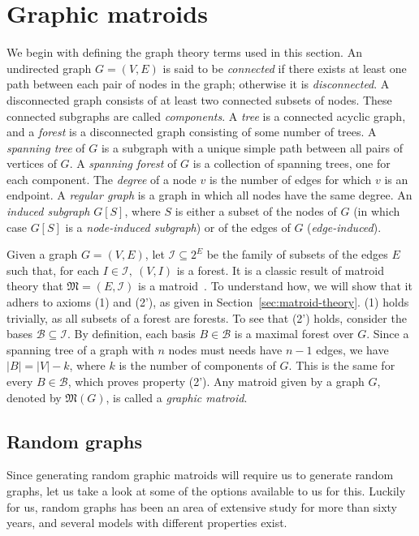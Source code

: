 \section{Graphic matroids}
We begin with defining the graph theory terms used in this section. An undirected graph $G=(V,E)$ is said to be \textit{connected} if there exists at least one path between each pair of nodes in the graph; otherwise it is \textit{disconnected}. A disconnected graph consists of at least two connected subsets of nodes. These connected subgraphs are called \textit{components}. A \textit{tree} is a connected acyclic graph, and a \textit{forest} is a disconnected graph consisting of some number of trees. A \textit{spanning tree} of $G$ is a subgraph with a unique simple path between all pairs of vertices of $G$. A \textit{spanning forest} of $G$ is a collection of spanning trees, one for each component. The \textit{degree} of a node $v$ is the number of edges for which $v$ is an endpoint. A \textit{regular graph} is a graph in which all nodes have the same degree. An \textit{induced subgraph} $G[S]$, where $S$ is either a subset of the nodes of $G$ (in which case $G[S]$ is a \textit{node-induced subgraph}) or of the edges of $G$ (\textit{edge-induced}).

Given a graph $G=(V,E)$, let $\mathcal{I} \subseteq 2^E$ be the family of subsets of the edges $E$ such that, for each $I \in \mathcal{I},\ (V, I)$ is a forest. It is a classic result of matroid theory that $\mathfrak{M} = (E, \mathcal{I})$ is a matroid~\cite[p.~657]{schrijver-2003}. To understand how, we will show that it adhers to axioms (1) and (2'), as given in Section~\ref{sec:matroid-theory}. (1) holds trivially, as all subsets of a forest are forests. To see that (2') holds, consider the bases $\mathcal{B} \subseteq \mathcal{I}$. By definition, each basis $B \in \mathcal{B}$ is a maximal forest over $G$. Since a spanning tree of a graph with $n$ nodes must needs have $n-1$ edges, we have $|B| = |V| - k$, where $k$ is the number of components of $G$. This is the same for every $B \in \mathcal{B}$, which proves property (2'). Any matroid given by a graph $G$, denoted by $\mathfrak{M}(G)$, is called a \textit{graphic matroid}.

\subsection{Random graphs}
Since generating random graphic matroids will require us to generate random graphs, let us take a look at some of the options available to us for this. Luckily for us, random graphs has been an area of extensive study for more than sixty years, and several models with different properties exist.

